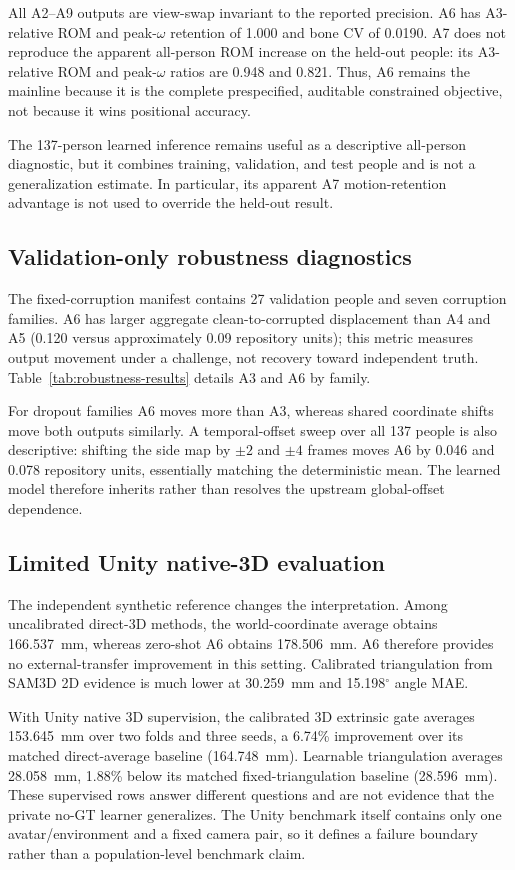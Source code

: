 All A2--A9 outputs are view-swap invariant to the reported precision. A6 has
A3-relative ROM and peak-$\omega$ retention of 1.000 and bone CV of 0.0190.
A7 does not reproduce the apparent all-person ROM increase on the held-out
people: its A3-relative ROM and peak-$\omega$ ratios are 0.948 and 0.821.
Thus, A6 remains the mainline because it is the complete prespecified,
auditable constrained objective, not because it wins positional accuracy.

The 137-person learned inference remains useful as a descriptive all-person
diagnostic, but it combines training, validation, and test people and is not a
generalization estimate. In particular, its apparent A7 motion-retention
advantage is not used to override the held-out result.

\subsection{Validation-only robustness diagnostics}

The fixed-corruption manifest contains 27 validation people and seven
corruption families. A6 has larger aggregate clean-to-corrupted displacement
than A4 and A5 (0.120 versus approximately 0.09 repository units); this metric
measures output movement under a challenge, not recovery toward independent
truth. Table~\ref{tab:robustness-results} details A3 and A6 by family.



For dropout families A6 moves more than A3, whereas shared coordinate shifts
move both outputs similarly. A temporal-offset sweep over all 137 people is
also descriptive: shifting the side map by $\pm2$ and $\pm4$ frames moves A6
by 0.046 and 0.078 repository units, essentially matching the deterministic
mean. The learned model therefore inherits rather than resolves the upstream
global-offset dependence.

\subsection{Limited Unity native-3D evaluation}



The independent synthetic reference changes the interpretation. Among
uncalibrated direct-3D methods, the world-coordinate average obtains
166.537~mm, whereas zero-shot A6 obtains 178.506~mm. A6 therefore provides no
external-transfer improvement in this setting. Calibrated triangulation from
SAM3D 2D evidence is much lower at 30.259~mm and 15.198$^\circ$ angle MAE.

With Unity native 3D supervision, the calibrated 3D extrinsic gate averages
153.645~mm over two folds and three seeds, a 6.74\% improvement over its
matched direct-average baseline (164.748~mm). Learnable triangulation averages
28.058~mm, 1.88\% below its matched fixed-triangulation baseline
(28.596~mm). These supervised rows answer different questions and are not
evidence that the private no-GT learner generalizes. The Unity benchmark itself
contains only one avatar/environment and a fixed camera pair, so it defines a
failure boundary rather than a population-level benchmark claim.
